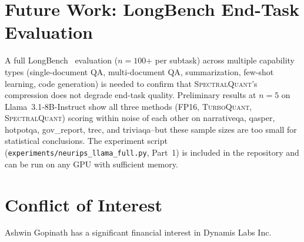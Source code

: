 \documentclass[11pt]{article}
\newcommand{\TQ}{\textsc{TurboQuant}}
\newcommand{\SQ}{\textsc{SpectralQuant}}
\begin{document}
\section{Future Work: LongBench End-Task Evaluation}
\label{app:longbench}

A full LongBench~\citep{bai2023longbench} evaluation ($n = 100$+ per subtask) across multiple capability
types (single-document QA, multi-document QA, summarization, few-shot learning,
code generation) is needed to confirm that \SQ{}'s compression does not degrade
end-task quality.  Preliminary results at $n = 5$ on Llama~3.1-8B-Instruct show
all three methods (FP16, \TQ{}, \SQ{}) scoring within noise of each other on
narrativeqa, qasper, hotpotqa, gov\_report, trec, and triviaqa--but these
sample sizes are too small for statistical conclusions.  The experiment script
(\texttt{experiments/neurips\_llama\_full.py}, Part~1) is included in the
repository and can be run on any GPU with sufficient memory.

\section*{Conflict of Interest}
Ashwin Gopinath has a significant financial interest in Dynamis Labs Inc.
\end{document}
